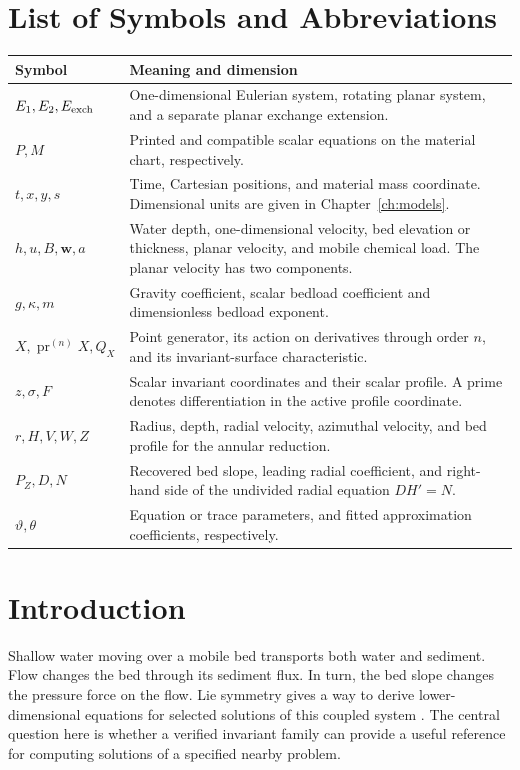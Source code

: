 \documentclass[12pt,a4paper,oneside]{report}
\numberwithin{equation}{chapter}
\theoremstyle{remark}\newtheorem{remark}[theorem]{Remark}
\newcommand{\pr}{\operatorname{pr}}
\begin{document}
\chapter*{List of Symbols and Abbreviations}\label{sec:notation}
\noindent\begin{tabularx}{\textwidth}{@{}p{}X@{}}
\toprule
Symbol & Meaning and dimension \\\midrule
$E_1,E_2,E_{\rm exch}$ & One-dimensional Eulerian system, rotating planar system, and a separate planar exchange extension.\\
$P,M$ & Printed and compatible scalar equations on the material chart, respectively.\\
$t,x,y,s$ & Time, Cartesian positions, and material mass coordinate. Dimensional units are given in Chapter~\ref{ch:models}.\\
$h,u,B,\mathbf w,a$ & Water depth, one-dimensional velocity, bed elevation or thickness, planar velocity, and mobile chemical load. The planar velocity has two components.\\
$g,\kappa,m$ & Gravity coefficient, scalar bedload coefficient and dimensionless bedload exponent.\\
$X,\pr^{(n)}X,Q_X$ & Point generator, its action on derivatives through order $n$, and its invariant-surface characteristic.\\
$z,\sigma,F$ & Scalar invariant coordinates and their scalar profile. A prime denotes differentiation in the active profile coordinate.\\
$r,H,V,W,Z$ & Radius, depth, radial velocity, azimuthal velocity, and bed profile for the annular reduction.\\
$P_Z,D,N$ & Recovered bed slope, leading radial coefficient, and right-hand side of the undivided radial equation $DH'=N$.\\
$\vartheta,\theta$ & Equation or trace parameters, and fitted approximation coefficients, respectively.\\
\bottomrule
\end{tabularx}
\clearpage
{}

\chapter{Introduction}\label{ch:introduction}
Shallow water moving over a mobile bed transports both water and sediment. Flow changes the bed through its sediment flux. In turn, the bed slope changes the pressure force on the flow. Lie symmetry gives a way to derive lower-dimensional equations for selected solutions of this coupled system \cite{fernandez2017,olver,oliveri}. The central question here is whether a verified invariant family can provide a useful reference for computing solutions of a specified nearby problem.
\end{document}
